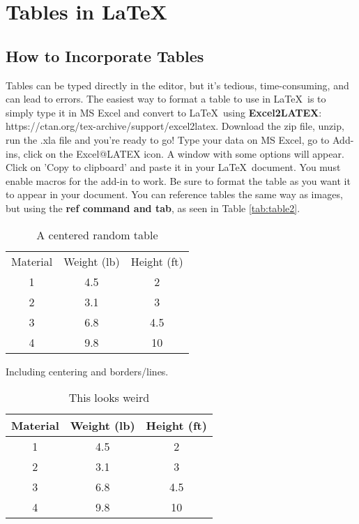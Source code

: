 
\chapter{Tables in \LaTeX}  

\section{How to Incorporate Tables}
\noindent Tables can be typed directly in the editor, but it's tedious, time-consuming, and can lead to errors. The easiest way to format a table to use in \LaTeX\ is to simply type it in MS Excel and convert to \LaTeX\ using \textbf{Excel2LATEX}: https://ctan.org/tex-archive/support/excel2latex. Download the zip file, unzip, run the .xla file and you're ready to go! Type your data on MS Excel, go to Add-ins, click on the Excel@LATEX icon. A window with some options will appear. Click on 'Copy to clipboard' and paste it in your \LaTeX\ document. You must enable macros for the add-in to work. Be sure to format the table as you want it to appear in your document. You can reference tables the same way as images, but using the \textbf{ref command and tab}, as seen in Table \ref{tab:table2}.
\begin{table}[htbp]
  \centering
  \caption{A centered random table}
    \begin{tabular}{ccc}
    Material & Weight (lb) & Height (ft) \\
    1     & 4.5   & 2 \\
    2     & 3.1   & 3 \\
    3     & 6.8   & 4.5 \\
    4     & 9.8   & 10 \\
    \end{tabular}%
  \label{tab:table1}%
\end{table}%

\noindent Including centering and borders/lines.

\begin{table}[htbp]
  \centering
  \caption{This looks weird}
    \begin{tabular}{|c|c|c|}
    \toprule
    \textbf{Material} & \textbf{Weight (lb)} & \textbf{Height (ft)} \\
    \midrule
    1     & 4.5   & 2 \\
    \midrule
    2     & 3.1   & 3 \\
    \midrule
    3     & 6.8   & 4.5 \\
    \midrule
    4     & 9.8   & 10 \\
    \bottomrule
    \end{tabular}%
  \label{tab:table3}%
\end{table}%

